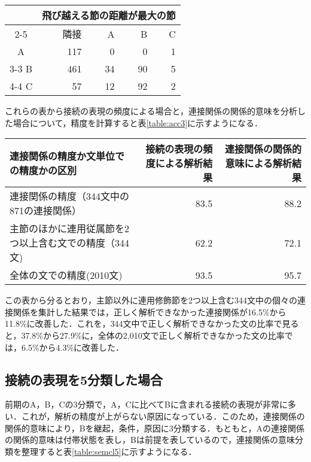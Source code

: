 \begin{table*}
\caption{用例における連接関係で係り側と飛び越える節の頻度 \\ （A，B，Cの3分類で連接関係の関係的意味による）}
\label{table:freq3sj}
\hspace*{25mm}
\begin{tabular}{|c|r|r|r|r|}
\hline
\multicolumn{1}{|p{4zw}|}{} & \multicolumn{4}{|c|}{飛び越える節の距離が最大の節}\\
\cline{2-5}
\multicolumn{1}{|p{4zw}|}{係り側} & \multicolumn{1}{|p{3zw}|}{隣接} & \multicolumn{1}{|p{3zw}|}{A} & \multicolumn{1}{|p{3zw}|}{B} & \multicolumn{1}{|p{3zw}|}{C} \\
\hline
A & 117 & 0 & 0 & 1 \\
\cline{3-3}
B & 461 & 34 & 90 & 5 \\
\cline{4-4}
C & 57 & 12 & 92 & 2 \\
\hline
\end{tabular}
\end{table*}

これらの表から接続の表現の頻度による場合と，連接関係の関係的意味を分析した場合について，精度を計算すると表\ref{table:acc3}に示すようになる．

\begin{table*}
\caption{A，B，Cの3分類を用いた場合の連接構造の解析精度（単位：％） }
\label{table:acc3}
\begin{tabular}{|l|r|r|}
\hline
\multicolumn{1}{|p{20zw}|}{連接関係の精度か文単位での精度かの区別} & \multicolumn{1}{|p{5zw}|}{接続の表現の頻度による解析結果} & \multicolumn{1}{|p{5zw}|}{連接関係の関係的意味による解析結果}\\
\hline
連接関係の精度（344文中の871の連接関係）&  83.5 &  88.2 \\
主節のほかに連用従属節を2つ以上含む文での精度（344文) & 62.2 & 72.1 \\
全体の文での精度(2010文) & 93.5 & 95.7 \\
\hline
\end{tabular}
\end{table*}

この表から分るとおり，主節以外に連用修飾節を2つ以上含む344文中の個々の連接関係を集計した結果では，正しく解析できなかった連接関係が16.5\%から11.8\%に改善した．これを，344文中で正しく解析できなかった文の比率で見ると，37.8\%から27.9\%に，全体の2,010文で正しく解析できなかった文の比率では，6.5\%から4.3\%に改善した．

\subsection{接続の表現を5分類した場合}
前期のA，B，Cの3分類で，A，Cに比べてBに含まれる接続の表現が非常に多い．これが，解析の精度が上がらない原因になっている．このため，連接関係の関係的意味により，Bを継起，条件，原因に3分類する．もともと，Aの連接関係の関係的意味は付帯状態を表し，Bは前提を表しているので，連接関係の意味分類を整理すると表\ref{table:semcl5}に示すようになる．


